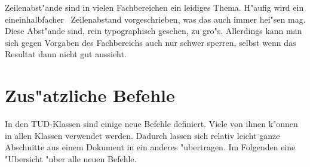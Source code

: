 \documentclass[twoside,colorback,accentcolor=tud4c,11pt]{tudreport}
\begin{document}
    Zeilenabst"ande sind in vielen Fachbereichen ein leidiges Thema. H"aufig
    wird ein \glqq eineinhalbfacher\grqq~ Zeilenabstand vorgeschrieben, was das
    auch immer hei"sen mag. Diese Abst"ande sind, rein typographisch
    gesehen, zu gro"s. Allerdings kann man sich gegen Vorgaben des
    Fachbereichs auch nur schwer sperren, selbst wenn das Resultat dann nicht
    gut aussieht.

  \section{Zus"atzliche Befehle}\label{sec_befehle}

    In den TUD-Klassen sind einige neue Befehle definiert. Viele von ihnen
    k"onnen in allen Klassen verwendet werden. Dadurch lassen sich relativ
    leicht ganze Abschnitte aus einem Dokument in ein anderes "ubertragen. Im
    Folgenden eine "Ubersicht "uber alle neuen Befehle.
\end{document}
